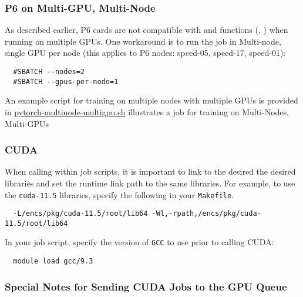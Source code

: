 
\subsubsection{P6 on Multi-GPU, Multi-Node}

As described earlier, P6 cards are not compatible with  and  functions
(, ) when running on multiple GPUs.
One workaround is to run the job in Multi-node, single GPU per node
(this applies to P6 nodes: speed-05, speed-17, speed-01):
\begin{verbatim}
  #SBATCH --nodes=2
  #SBATCH --gpus-per-node=1
\end{verbatim}

\noindent An example script for training on multiple nodes with multiple GPUs is provided in 
\href{https://github.com/NAG-DevOps/speed-hpc/blob/master/src/pytorch-multinode-multigpu.sh}{pytorch-multinode-multigpu.sh}
illustrates a job for training on Multi-Nodes, Multi-GPUs

\subsubsection{CUDA}

When calling  within job scripts, it is important to link to the desired
the desired  libraries and set the runtime link path to the same libraries. 
For example, to use the \texttt{cuda-11.5} libraries, specify the following in your \texttt{Makefile}.
\begin{verbatim}
  -L/encs/pkg/cuda-11.5/root/lib64 -Wl,-rpath,/encs/pkg/cuda-11.5/root/lib64
\end{verbatim}

\noindent In your job script, specify the version of \texttt{GCC} to use prior to calling CUDA:
\begin{verbatim}
  module load gcc/9.3
\end{verbatim}

\subsubsection{Special Notes for Sending CUDA Jobs to the GPU Queue}

